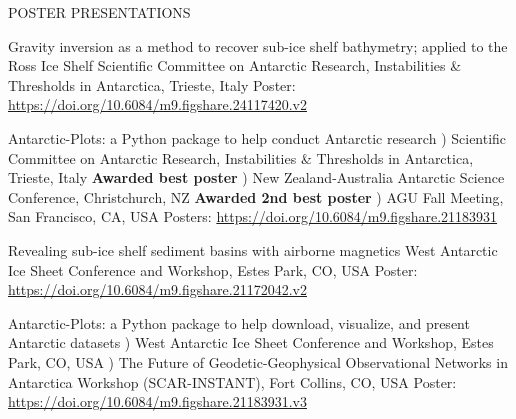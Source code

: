 \documentclass{ExpressiveResume}
\begin{document}
\vspace{-1em}
\noindent POSTER PRESENTATIONS \newline
\begin{cventries}

    {Gravity inversion as a method to recover sub-ice shelf bathymetry; applied to the Ross Ice Shelf}
    {Scientific Committee on Antarctic Research, Instabilities \&
        Thresholds in Antarctica, Trieste, Italy}
    {Poster: \url{https://doi.org/10.6084/m9.figshare.24117420.v2}}
    {}
    {}

    \talk{}
    {Antarctic-Plots: a Python package to help conduct Antarctic research}
    {) Scientific Committee on Antarctic Research, Instabilities \&
        Thresholds in Antarctica, Trieste, Italy
        \newline \hspace*{1em} \textbf{Awarded best poster}
    ) New Zealand-Australia Antarctic Science Conference, Christchurch, NZ
        \newline \hspace*{1em} \textbf{Awarded 2nd best poster}
    ) AGU Fall Meeting, San Francisco, CA, USA
        }
    {Posters: \url{https://doi.org/10.6084/m9.figshare.21183931}}
    {}

    {Revealing sub-ice shelf sediment basins with airborne magnetics}
    {West Antarctic Ice Sheet Conference and Workshop, Estes Park, CO, USA}
    {Poster: \url{https://doi.org/10.6084/m9.figshare.21172042.v2}}
    {}
    {}

    \talk{} %
    {Antarctic-Plots: a Python package to help download, visualize, and present Antarctic datasets}
    {) West Antarctic Ice Sheet Conference and Workshop, Estes Park, CO, USA
        ) The Future of Geodetic-Geophysical Observational Networks in
        Antarctica Workshop (SCAR-INSTANT), Fort Collins, CO, USA
    }
    {Poster: \url{https://doi.org/10.6084/m9.figshare.21183931.v3}}
    {}
    {}



\end{cventries}
\end{document}
